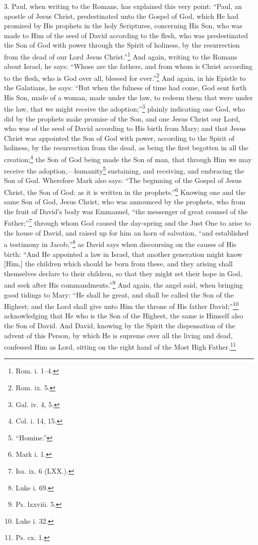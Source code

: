 3. Paul, when writing to the Romans, has explained this very point: “Paul, an apostle of Jesus Christ, predestinated unto the Gospel of God, which He had promised by His prophets in the holy Scriptures, concerning His Son, who was made to Him of the seed of David according to the flesh, who was predestinated the Son of God with power through the Spirit of holiness, by the resurrection from the dead of our Lord Jesus Christ.”\footnote{Rom. i. 1–4.} And again, writing to the Romans about Israel, he says: “Whose are the fathers, and from whom is Christ according to the flesh, who is God over all, blessed for ever.”\footnote{Rom. ix. 5.} And again, in his Epistle to the Galatians, he says: “But when the fulness of time had come, God sent forth His Son, made of a woman, made under the law, to redeem them that were under the law, that we might receive the adoption;”\footnote{Gal. iv. 4, 5.} plainly indicating one God, who did by the prophets make promise of the Son, and one Jesus Christ our Lord, who was of the seed of David according to His birth from Mary; and that Jesus Christ was appointed the Son of God with power, according to the Spirit of holiness, by the resurrection from the dead, as being the first begotten in all the creation;\footnote{Col. i. 14, 15.} the Son of God being made the Son of man, that through Him we may receive the adoption,—humanity\footnote{“Homine.”} sustaining, and receiving, and embracing the Son of God. Wherefore Mark also says: “The beginning of the Gospel of Jesus Christ, the Son of God; as it is written in the prophets.”\footnote{Mark i. 1.} Knowing one and the same Son of God, Jesus Christ, who was announced by the prophets, who from the fruit of David’s body was Emmanuel, “the messenger of great counsel of the Father;”\footnote{Isa. ix. 6 (LXX.).} through whom God caused the day-spring and the Just One to arise to the house of David, and raised up for him an horn of salvation, “and established a testimony in Jacob;”\footnote{Luke i. 69.} as David says when discoursing on the causes of His birth: “And He appointed a law in Israel, that another generation might know [Him,] the children which should he born from these, and they arising shall themselves declare to their children, so that they might set their hope in God, and seek after His commandments.”\footnote{Ps. lxxviii. 5.} And again, the angel said, when bringing good tidings to Mary: “He shall he great, and shall be called the Son of the Highest; and the Lord shall give unto Him the throne of His father David;”\footnote{Luke i. 32.} acknowledging that He who is the Son of the Highest, the same is Himself also the Son of David. And David, knowing by the Spirit the dispensation of the advent of this Person, by which He is supreme over all the living and dead, confessed Him as Lord, sitting on the right hand of the Most High Father.\footnote{Ps. cx. 1.}


